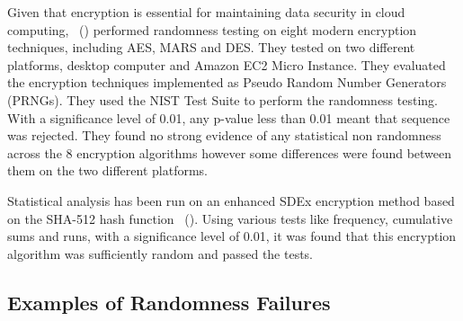 Given that encryption is essential for maintaining data security in cloud computing, ~(\cite{6236554}) performed randomness testing on eight modern encryption techniques, including AES, MARS and DES. They tested on two different platforms, desktop computer and Amazon EC2 Micro Instance. They evaluated the encryption techniques implemented as Pseudo Random Number Generators (PRNGs). They used the NIST Test Suite to perform the randomness testing. With a significance level of 0.01, any p-value less than 0.01 meant that sequence was rejected. They found no strong evidence of any statistical non randomness across the 8 encryption algorithms however some differences were found between them on the two different platforms. \par

Statistical analysis has been run on an enhanced SDEx encryption method based on the SHA-512 hash function ~(\cite{9209663}). Using various tests like frequency, cumulative sums and runs, with a significance level of 0.01, it was found that this encryption algorithm was sufficiently random and passed the tests. \par

\subsection{Examples of Randomness Failures}